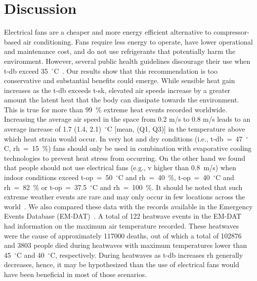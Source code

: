 
\section{Discussion}\label{sec:discussion}

Electrical fans are a cheaper and more energy efficient alternative to compressor-based air conditioning.
Fans require less energy to operate, have lower operational and maintenance cost, and do not use refrigerants that potentially harm the environment.
However, several public health guidelines discourage their use when \acf{t-db} exceed 35~$^{\circ}$C~\cite{WMO2015}.
Our results show that this recommendation is too conservative and substantial benefits could emerge.
While sensible heat gain increases as the \ac{t-db} exceeds \acf{t-sk}, elevated air speeds increase by a greater amount the latent heat that the body can dissipate towards the environment.
This is true for more than 99~\% extreme heat events recorded worldwide.
Increasing the average air speed in the space from 0.2 m/s to 0.8 m/s leads to an average increase of 1.7 (1.4, 2.1)~$^{\circ}$C [mean, (Q1, Q3)] in the temperature above which heat strain would occur.
In very hot and dry conditions (i.e., \ac{t-db}~=~47~$^{\circ}$C, \ac{rh}~=~15~\%) fans should only be used in combination with evaporative cooling technologies to prevent heat stress from occurring.
On the other hand we found that people should not use electrical fans (e.g., \ac{v} higher than 0.8~m/s) when indoor conditions exceed \ac{t-op}~=~50~$^{\circ}$C and \ac{rh}~=~40~\%, \ac{t-op}~=~40~$^{\circ}$C and \ac{rh}~=~82~\% or \ac{t-op}~=~37.5~$^{\circ}$C and \ac{rh}~=~100~\%.
It should be noted that such extreme weather events are rare and may only occur in few locations across the world~\cite{ASHRA2017}.
We also compared these data with the records available in the Emergency Events Database (EM-DAT)~\cite{EMDATThe70:online}.
A total of 122 heatwave events in the EM-DAT had information on the maximum air temperature recorded.
These heatwaves were the cause of approximately 117000 deaths, out of which a total of 102876 and 3803 people died during heatwaves with maximum temperatures lower than 45~$^{\circ}$C and 40~$^{\circ}$C, respectively.
During heatwaves as \ac{t-db} increases \ac{rh} generally decreases, hence, it may be hypothesized than the use of electrical fans would have been beneficial in most of those scenarios.

